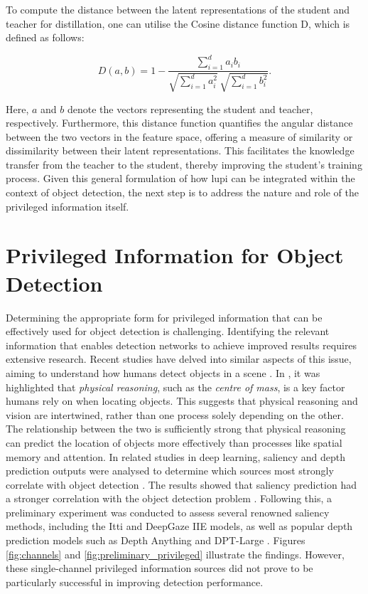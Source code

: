 To compute the distance between the latent representations of the student and teacher for distillation, one can utilise the Cosine distance function \gls{D}, which is defined as follows:

\begin{equation} \label{eq:cosine_distance}
D(a, b) = 1 - \frac{\sum_{i=1}^{d} a_i b_i}{\sqrt{\sum_{i=1}^{d} a_i^2} \, \sqrt{\sum_{i=1}^{d} b_i^2}} .
\end{equation}

\noindent Here, \( a \) and \( b \) denote the vectors representing the student and teacher, respectively. Furthermore, this distance function quantifies the angular distance between the two vectors in the feature space, offering a measure of similarity or dissimilarity between their latent representations. This facilitates the knowledge transfer from the teacher to the student, thereby improving the student's training process.
Given this general formulation of how \gls{lupi} can be integrated within the context of object detection, the next step is to address the nature and role of the privileged information itself.

\section{Privileged Information for Object Detection}
\label{sec:4_privileged_information}

Determining the appropriate form for privileged information that can be effectively used for object detection is challenging. Identifying the relevant information that enables detection networks to achieve improved results requires extensive research. Recent studies have delved into similar aspects of this issue, aiming to understand how humans detect objects in a scene \cite{object_detection_philospy}. In \cite{object_detection_philospy}, it was highlighted that \textit{physical reasoning}, such as the \textit{centre of mass}, is a key factor humans rely on when locating objects. This suggests that physical reasoning and vision are intertwined, rather than one process solely depending on the other. The relationship between the two is sufficiently strong that physical reasoning can predict the location of objects more effectively than processes like spatial memory and attention.
In related studies in deep learning, saliency \cite{itti, deepgaze} and depth prediction \cite{depth_anything, dpt_large} outputs were analysed to determine which sources most strongly correlate with object detection \cite{bartolo2024correlationobjectdetectionperformance}. The results showed that saliency prediction had a stronger correlation with the object detection problem \cite{bartolo2024correlationobjectdetectionperformance}. Following this, a preliminary experiment was conducted to assess several renowned saliency methods, including the Itti \cite{itti} and DeepGaze IIE \cite{deepgaze} models, as well as popular depth prediction models such as Depth Anything \cite{depth_anything} and DPT-Large \cite{dpt_large}. Figures \ref{fig:channels} and \ref{fig:preliminary_privileged} illustrate the findings. However, these single-channel privileged information sources did not prove to be particularly successful in improving detection performance.

